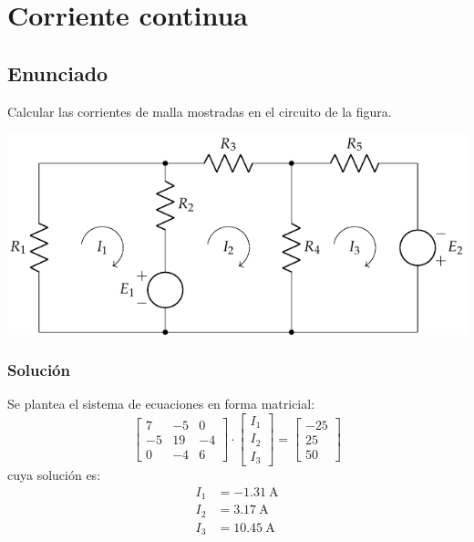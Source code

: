 \chapter{Corriente continua}

\section{Enunciado}
Calcular las corrientes de malla mostradas en el circuito de la
figura.

\begin{center}
  \includegraphics{figuras/BT1_02.pdf}
\end{center}

  \subsection*{Solución}
  Se plantea el sistema de ecuaciones en forma matricial:
  \begin{equation*}
    \begin{bmatrix}
      7 & -5 & 0 \\
      -5 & 19 & -4 \\
      0 & -4 & 6
    \end{bmatrix} \cdot
    \begin{bmatrix}
      I_1\\
      I_2\\
      I_3
    \end{bmatrix} = %
    \begin{bmatrix}
      -25 \\
      25\\
      50
    \end{bmatrix}
  \end{equation*}
  cuya solución es:
  \begin{align*}
    I_1&=\qty{-1.31}{\ampere}\\
    I_2&=\qty{3.17}{\ampere}\\
    I_3&=\qty{10.45}{\ampere}
  \end{align*}

